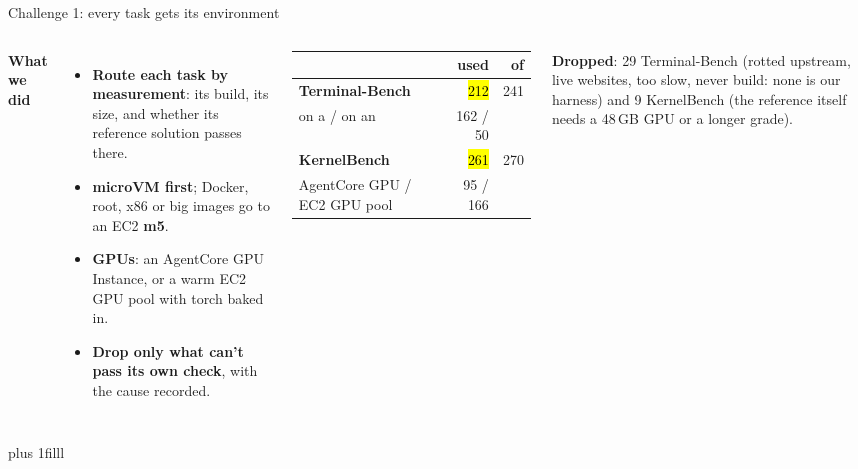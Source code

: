 \begin{frame}{Challenge 1: every task gets its environment}
\begin{columns}[T]
{\normalsize\textbf{What we did}}
\begin{itemize}\small\setlength{\itemsep}{1.2mm}
\item \textbf{Route each task by measurement}: its build, its size, and whether its reference solution passes there.
\item \textbf{microVM first}; Docker, root, x86 or big images go to an EC2 \textbf{m5}.
\item \textbf{GPUs}: an AgentCore GPU Instance, or a warm EC2 GPU pool with torch baked in.
\item \textbf{Drop only what can't pass its own check}, with the cause recorded.
\end{itemize}
\small\setlength{\tabcolsep}{4pt}\renewcommand{\arraystretch}{1.3}
\begin{tabularx}{\linewidth}{@{}Y r r@{}}
\toprule
& \textbf{used} & \textbf{of}\\
\midrule
\textbf{Terminal-Bench} & \hl{212} & 241\\
\quad on a \smv{} / on an \sm{} & 162 / 50 &\\
\textbf{KernelBench} & \hl{261} & 270\\
\quad AgentCore GPU / EC2 GPU pool & 95 / 166 &\\
\bottomrule
\end{tabularx}
\par\vspace{2mm}
{\footnotesize\textbf{Dropped}: 29 Terminal-Bench (rotted upstream, live websites, too slow, never build: none is our harness) and 9 KernelBench (the reference itself needs a 48\,GB GPU or a longer grade).\par}
\end{columns}
\par\vskip 0pt plus 1filll
\end{frame}

